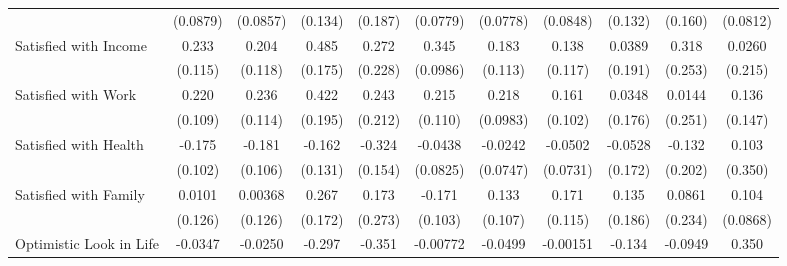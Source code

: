 {\begin{tabular}{l*{10}{c}}
            &    (0.0879)         &    (0.0857)         &     (0.134)         &     (0.187)         &    (0.0779)         &    (0.0778)         &    (0.0848)         &     (0.132)         &     (0.160)         &    (0.0812)         \\
\addlinespace
Satisfied with Income&       0.233\sym{*}  &       0.204         &       0.485\sym{**} &       0.272         &       0.345\sym{***}&       0.183         &       0.138         &      0.0389         &       0.318         &      0.0260         \\
            &     (0.115)         &     (0.118)         &     (0.175)         &     (0.228)         &    (0.0986)         &     (0.113)         &     (0.117)         &     (0.191)         &     (0.253)         &     (0.215)         \\
\addlinespace
Satisfied with Work&       0.220\sym{*}  &       0.236\sym{*}  &       0.422\sym{*}  &       0.243         &       0.215         &       0.218\sym{*}  &       0.161         &      0.0348         &      0.0144         &       0.136         \\
            &     (0.109)         &     (0.114)         &     (0.195)         &     (0.212)         &     (0.110)         &    (0.0983)         &     (0.102)         &     (0.176)         &     (0.251)         &     (0.147)         \\
\addlinespace
Satisfied with Health&      -0.175         &      -0.181         &      -0.162         &      -0.324\sym{*}  &     -0.0438         &     -0.0242         &     -0.0502         &     -0.0528         &      -0.132         &       0.103         \\
            &     (0.102)         &     (0.106)         &     (0.131)         &     (0.154)         &    (0.0825)         &    (0.0747)         &    (0.0731)         &     (0.172)         &     (0.202)         &     (0.350)         \\
\addlinespace
Satisfied with Family&      0.0101         &     0.00368         &       0.267         &       0.173         &      -0.171         &       0.133         &       0.171         &       0.135         &      0.0861         &       0.104         \\
            &     (0.126)         &     (0.126)         &     (0.172)         &     (0.273)         &     (0.103)         &     (0.107)         &     (0.115)         &     (0.186)         &     (0.234)         &    (0.0868)         \\
\addlinespace
Optimistic Look in Life&     -0.0347         &     -0.0250         &      -0.297\sym{**} &      -0.351\sym{**} &    -0.00772         &     -0.0499         &    -0.00151         &      -0.134         &     -0.0949         &       0.350\sym{***}\\

\end{tabular}}
